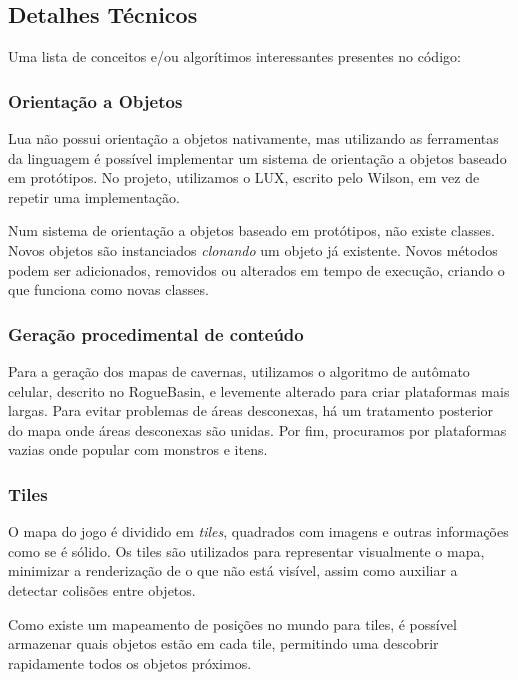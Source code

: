   \subsection{Detalhes Técnicos}
    Uma lista de conceitos e/ou algorítimos interessantes presentes no código:
    
    \subsubsection{Orientação a Objetos}
      Lua não possui orientação a objetos nativamente, mas utilizando as ferramentas da linguagem é possível
      implementar um sistema de orientação a objetos baseado em protótipos.
      No projeto, utilizamos o LUX\footnotemark{}, escrito pelo Wilson, em vez de repetir uma implementação.
      
      Num sistema de orientação a objetos baseado em protótipos, não existe classes. Novos objetos são instanciados
      \textit{clonando} um objeto já existente. Novos métodos podem ser adicionados, removidos ou alterados em
      tempo de execução, criando o que funciona como novas classes.
      
    
    \subsubsection{Geração procedimental de conteúdo}
      Para a geração dos mapas de cavernas, utilizamos o algoritmo de autômato celular, descrito no RogueBasin,
      \cite{roguebasin:cellularautomata} e levemente alterado para criar plataformas mais largas. Para
      evitar problemas de áreas desconexas, há um tratamento posterior do mapa onde áreas desconexas são unidas.
      Por fim, procuramos por plataformas vazias onde popular com monstros e itens.
      
    \subsubsection{Tiles}
      O mapa do jogo é dividido em \textit{tiles}, quadrados com imagens e outras informações como se é sólido.
      Os tiles são utilizados para representar visualmente o mapa, minimizar a renderização de o que não está
      visível, assim como auxiliar a detectar colisões entre objetos.
      
      Como existe um mapeamento de posições no mundo para tiles, é possível armazenar quais objetos estão em cada
      tile, permitindo uma descobrir rapidamente todos os objetos próximos.
